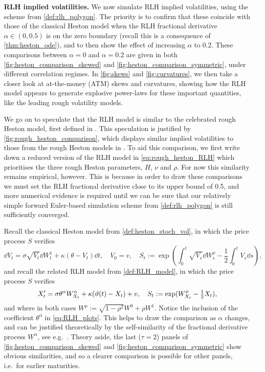 \vspace{3mm}\textbf{RLH implied volatilities.} We now simulate RLH implied volatilities, using the scheme from \autoref{def:rlh_polygon}. The priority is to confirm that these coincide with those of the classical Heston model when the RLH fractional derivative $\alpha\in(0,0.5)$ is on the zero boundary (recall this is a consequence of \autoref{thm:heston_ode}), and to then show the effect of increasing $\alpha$ to 0.2. These comparisons between $\alpha = 0$ and $\alpha=0.2$ are given in both \autoref{fig:heston_comparison_skewed} and \autoref{fig:heston_comparison_symmetric}, under different correlation regimes. In \autoref{fig:skews} and \autoref{fig:curvatures}, we then take a closer look at at-the-money (ATM) skews and curvatures, showing how the RLH model appears to generate explosive power-laws for these important quantities, like the leading rough volatility models.

We go on to speculate that the RLH model is similar to the celebrated rough Heston model, first defined in \cite{eleuch_2019a}. This speculation is justified by \autoref{fig:rough_heston_comparison}, which displays similar implied volatilities to those from the rough Heston models in \cite{eleuch_2019b}. To aid this comparison, we first write down a reduced version of the RLH model in \autoref{eq:rough_heston_RLH} which prioritises the three rough Heston parameters, $H$, $\nu$ and $\rho$. For now this similarity remains empirical, however. This is because in order to draw these comparisons we must set the RLH fractional derivative close to its upper bound of 0.5, and more numerical evidence is required until we can be sure that our relatively simple forward Euler-based simulation scheme from \autoref{def:rlh_polygon} is still sufficiently converged.

Recall the classical Heston model from \autoref{def:heston_stoch_vol}, in which the price process $S$ verifies
\begin{equation}\label{eq:heston_plots}
    \dd V_t = \sigma\sqrt{V_t}\dd W^1_t + \kappa(\theta - V_t)\dd t,\quad V_0=v,\quad S_t := \exp\left(\int_0^t\sqrt{V_s}\dd W^\rho_s - \frac12 \int_0^t V_s\dd s\right),
\end{equation}
and recall the related RLH model from \autoref{def:RLH_model}, in which the price process $S$ verifies~
\begin{equation}\label{eq:RLH_plots}
    X'_t = \sigma\theta^\alpha W^\alpha_{X_t} + \kappa(\vartheta(t) - X_t)+v,\quad S_t :=\exp(W^\rho_{X_t}-\tfrac12 X_t),
\end{equation}
and where in both cases $W^\rho := \sqrt{1-\rho^2}W^0 + \rho W^1$. Notice the inclusion of the coefficient $\theta^\alpha$ in \autoref{eq:RLH_plots}. This helps to draw the comparison as $\alpha$ changes, and can be justified theoretically by the self-similarity of the fractional derivative process $W^\alpha$, see e.g.~\cite{jacquier_2018}. Theory aside, the last ($\tau=2$) panels of \autoref{fig:heston_comparison_skewed} and \autoref{fig:heston_comparison_symmetric} show obvious similarities, and so a clearer comparison is possible for other panels, i.e.~for earlier maturities.

